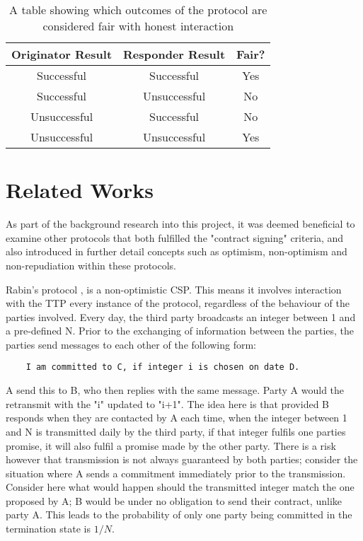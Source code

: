 \documentclass{l4proj}
\begin{document}
\begin{table}[h!]
\centering
\begin{tabular}{c|c || c}
 Originator Result & Responder Result & Fair?  \\
 \hline
 Successful & Successful & Yes \\
  Successful & Unsuccessful & No \\
    Unsuccessful & Successful & No \\
      Unsuccessful & Unsuccessful & Yes
 
\end{tabular}
\caption{A table showing which outcomes of the protocol are considered fair with honest interaction}
\label{fair}
\end{table}

\section{Related Works}

As part of the background research into this project, it was deemed beneficial to examine other protocols that both fulfilled the "contract signing" criteria, and also introduced in further detail concepts such as optimism, non-optimism and non-repudiation within these protocols.

Rabin's protocol \cite{rabin1983transaction}, is a non-optimistic CSP. This means it involves interaction with the TTP every instance of the protocol, regardless of the behaviour of the parties involved. Every day, the third party broadcasts an integer between 1 and a pre-defined N. Prior to the exchanging of information between the parties, the parties send messages to each other of the following form:
\begin{lstlisting}
    I am committed to C, if integer i is chosen on date D.
\end{lstlisting}
A send this to B, who then replies with the same message. Party A would the retransmit with the "i" updated to "i+1". The idea here is that provided B responds when they are contacted by A each time, when the integer between 1 and N is transmitted daily by the third party, if that integer fulfils one parties promise, it will also fulfil a promise made by the other party. There is a risk however that transmission is not always guaranteed by both parties; consider the situation where A sends a commitment immediately prior to the transmission. Consider here what would happen should the transmitted integer match the one proposed by A; B would be under no obligation to send their contract, unlike party A. This leads to the probability of only one party being committed in the termination state is $1/N$.
\end{document}
